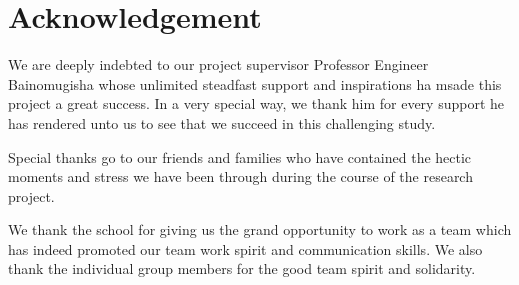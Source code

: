 \chapter*{Acknowledgement}
We are deeply indebted to our project supervisor Professor Engineer Bainomugisha whose unlimited steadfast support and inspirations ha msade this project a great success. In a very special way, we thank him for every support he has rendered unto us to see that we succeed in this challenging study.

Special thanks go to our friends and families who have contained the hectic moments and stress we have been through during the course of the research project.

We thank the school for giving us the grand opportunity to work as a team which has indeed promoted our team work spirit and communication skills. We also thank the individual group members for the good team spirit and solidarity.

\newpage